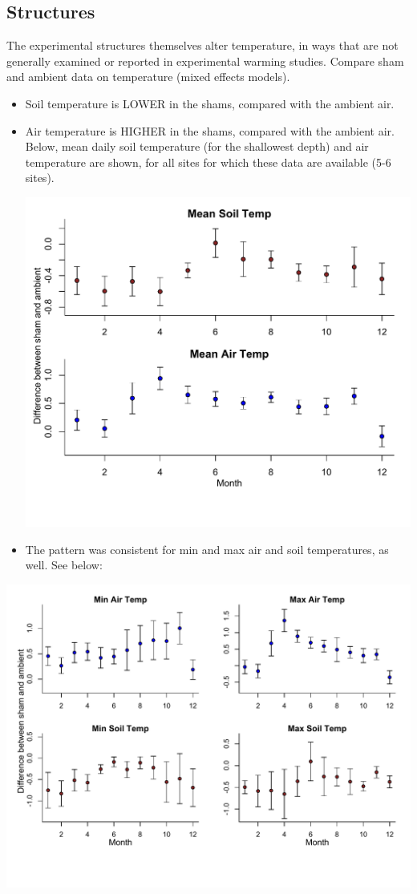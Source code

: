 \documentclass{article}
\begin{document}
\subsection  {Structures}
The experimental structures themselves alter temperature, in ways that are not generally examined or reported in experimental warming studies. Compare sham and ambient data on temperature (mixed effects models).
\begin{itemize}
\item Soil temperature is LOWER in the shams, compared with the ambient air. 
\item Air temperature is HIGHER in the shams, compared with the ambient air. 
Below, mean daily soil temperature (for the shallowest depth) and air temperature are shown, for all sites for which these data are available (5-6 sites). 

\includegraphics{Analyses/figures/ShamVSAmbient_mean.pdf}
\item The pattern was consistent for min and max air and soil temperatures, as well. See below: 
\end{itemize}
\includegraphics{Analyses/figures/ShamVSAmbient_minmax.pdf}
\end{document}
